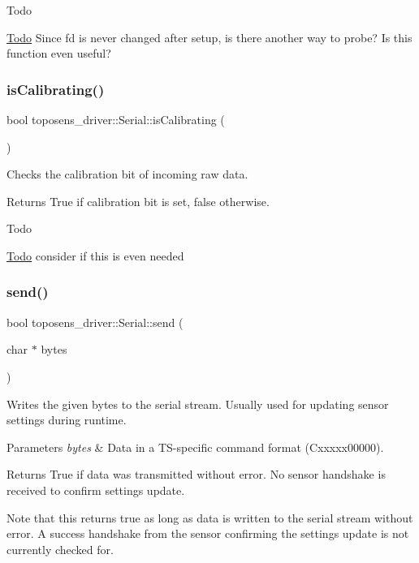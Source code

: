 \begin{DoxyRefDesc}{Todo}
\item[\hyperlink{todo__todo000001}{Todo}]Since fd is never changed after setup, is there another way to probe? Is this function even useful? \end{DoxyRefDesc}
\mbox{\label{classtoposens__driver_1_1Serial_a4837c845aedc74cc1b9a62acb71b0cef}} 
\subsubsection{\texorpdfstring{is\+Calibrating()}{isCalibrating()}}
{\footnotesize\ttfamily bool toposens\+\_\+driver\+::\+Serial\+::is\+Calibrating (\begin{DoxyParamCaption}{ }\end{DoxyParamCaption})}

Checks the calibration bit of incoming raw data. \begin{DoxyReturn}{Returns}
True if calibration bit is set, false otherwise.
\end{DoxyReturn}
\begin{DoxyRefDesc}{Todo}
\item[\hyperlink{todo__todo000002}{Todo}]consider if this is even needed \end{DoxyRefDesc}
\mbox{\label{classtoposens__driver_1_1Serial_aea7a45dbb1d2edb0b5e60b1cae10584b}} 
\subsubsection{\texorpdfstring{send()}{send()}}
{\footnotesize\ttfamily bool toposens\+\_\+driver\+::\+Serial\+::send (\begin{DoxyParamCaption}\item[{char $\ast$}]{bytes }\end{DoxyParamCaption})}

Writes the given bytes to the serial stream. Usually used for updating sensor settings during runtime. 
\begin{DoxyParams}{Parameters}
{\em bytes} & Data in a T\+S-\/specific command format (Cxxxxx00000). \\
\hline
\end{DoxyParams}
\begin{DoxyReturn}{Returns}
True if data was transmitted without error. No sensor handshake is received to confirm settings update.
\end{DoxyReturn}
Note that this returns true as long as data is written to the serial stream without error. A success handshake from the sensor confirming the settings update is not currently checked for.

